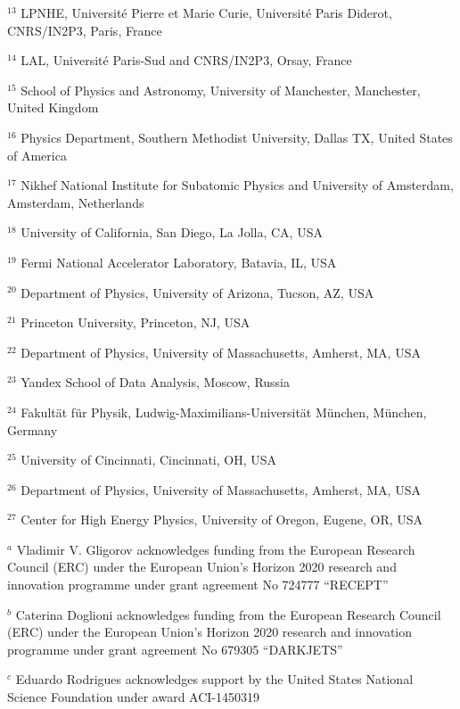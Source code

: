 \par {\footnotesize $^{13}$ LPNHE, Université Pierre et Marie Curie, Université Paris Diderot, CNRS/IN2P3, Paris, France}
\par {\footnotesize $^{14}$ LAL, Université Paris-Sud and CNRS/IN2P3, Orsay, France}
\par {\footnotesize $^{15}$ School of Physics and Astronomy, University of Manchester, Manchester, United Kingdom}
\par {\footnotesize $^{16}$ Physics Department, Southern Methodist University, Dallas TX, United States of America}
\par {\footnotesize $^{17}$ Nikhef National Institute for Subatomic Physics and University of Amsterdam, Amsterdam, Netherlands}
\par {\footnotesize $^{18}$ University of California, San Diego, La Jolla, CA, USA}
\par {\footnotesize $^{19}$ Fermi National Accelerator Laboratory, Batavia, IL, USA}
\par {\footnotesize $^{20}$ Department of Physics, University of Arizona, Tucson, AZ, USA}
\par {\footnotesize $^{21}$ Princeton University, Princeton, NJ, USA}
\par {\footnotesize $^{22}$ Department of Physics, University of Massachusetts, Amherst, MA, USA}
\par {\footnotesize $^{23}$ Yandex School of Data Analysis, Moscow, Russia}
\par {\footnotesize $^{24}$ Fakultät für Physik, Ludwig-Maximilians-Universität München, München, Germany}
\par {\footnotesize $^{25}$ University of Cincinnati, Cincinnati, OH, USA}
\par {\footnotesize $^{26}$ Department of Physics, University of Massachusetts, Amherst, MA, USA}
\par {\footnotesize $^{27}$ Center for High Energy Physics, University of Oregon, Eugene, OR, USA}
\bigskip
\par {\footnotesize $^{a}$ Vladimir V. Gligorov acknowledges funding from the European Research Council (ERC) under the European Union's Horizon 2020 research and innovation programme under grant agreement No 724777 “RECEPT”}
\par {\footnotesize $^{b}$ Caterina Doglioni acknowledges funding from the European Research Council (ERC) under the European Union's Horizon 2020 research and innovation programme under grant agreement No 679305 “DARKJETS”}
\par {\footnotesize $^{c}$  Eduardo Rodrigues acknowledges support by the United States National Science Foundation under award ACI-1450319}
